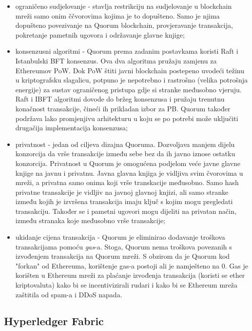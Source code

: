 \documentclass[times, utf8, diplomski]{fer}
\begin{document}
\begin{itemize}

\item ograničeno sudjelovanje - stavlja restrikciju na sudjelovanje u blockchain mreži samo onim ččvorovima kojima je to dopušteno. Samo je njima dopušteno povezivanje na Quorum blockchain, provjeravanje transakcija, pokretanje pametnih ugovora i održavanje glavne knjige;

\item konsenzusni algoritmi - Quorum prema zadanim postavkama koristi Raft i Istanbulski BFT konsenzus. Ova dva algoritma pružaju zamjenu za Ethereumov PoW. Dok PoW štiti javni blockchain postepeno uvodeći težinu u kriptografsku slagalicu, potpuno je nepotrebno i rastrošno (velika potrošnja energije) za sustav ograničenog pristupa gdje si stranke međusobno vjeruju. Raft i IBFT algoritmi dovode do bržeg konsenzusa i pružaju trenutnu konačnost transakcije, čineći ih prikladan izbor za PB. Quorum također podržava lako promjenjivu arhitekturu u koju se po potrebi može uključiti drugačija implementacija konsenzusa;

\item privatnost - jedan od ciljeva dizajna Quoruma. Dozvoljava manjem dijelu konzorcija da vrše transakcije između sebe bez da ih javno iznose ostatku konzorcija. Privatnost u Quorum je omogućena podjelom veće javne glavne knjige na javnu i privatnu. Javna glavna knjiga je vidljiva svim čvorovima u mreži, a privatna samo onima koji vrše transkacije međusobno. Samo hash privatne transakcije je vidljiv na javnoj glavnoj knjizi, ali samo stranke između kojih je izvršena transakcija imaju ključ s kojim mogu pregledati transakciju. Također se i pametni ugovori mogu dijeliti na privatan način, između stranaka koje međusobno vrše transakcije;

\item ukidanje cijena transakcija - Quorum je eliminirao dodavanje troškova transakcijama pomoću \textit{gas}-a. Stoga, Quorum nema troškova povezanih s izvođenjem transakcija na Quorum mreži. S obzirom da je Quorum kod "forkan" od Ethereuma, korištenje gas-a postoji ali je namješteno na 0. Gas je korišten u Ethereum mreži za plaćanje izvođenja transakcija (koristi se ether kriptovaluta) kako bi se incentivizirali rudari i kako bi se Ethereum mreža zaštitila od spam-a i DDoS napada.

\end{itemize}

\subsection{Hyperledger Fabric}
\end{document}
